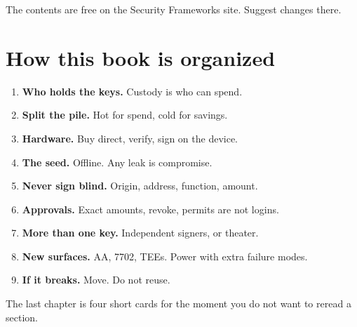 The contents are free on the Security Frameworks site.
Suggest changes there.

\section{How this book is organized}

\begin{enumerate}
  \item \textbf{Who holds the keys.} Custody is who can
  spend.
  \item \textbf{Split the pile.} Hot for spend, cold for
  savings.
  \item \textbf{Hardware.} Buy direct, verify, sign on
  the device.
  \item \textbf{The seed.} Offline. Any leak is
  compromise.
  \item \textbf{Never sign blind.} Origin, address,
  function, amount.
  \item \textbf{Approvals.} Exact amounts, revoke,
  permits are not logins.
  \item \textbf{More than one key.} Independent signers,
  or theater.
  \item \textbf{New surfaces.} AA, 7702, TEEs. Power
  with extra failure modes.
  \item \textbf{If it breaks.} Move. Do not reuse.
\end{enumerate}

The last chapter is four short cards for the moment you
do not want to reread a section.
